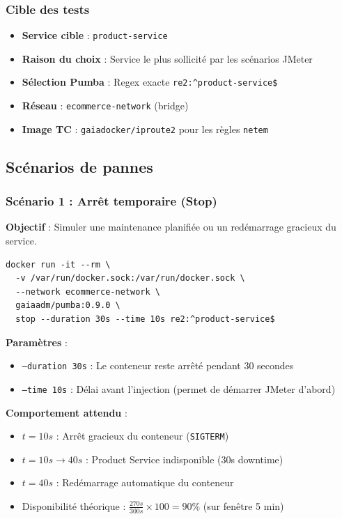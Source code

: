 \subsubsection{Cible des tests}

\begin{itemize}
    \item \textbf{Service cible} : \texttt{product-service}
    \item \textbf{Raison du choix} : Service le plus sollicité par les scénarios JMeter
    \item \textbf{Sélection Pumba} : Regex exacte \texttt{re2:\^{}product-service\$}
    \item \textbf{Réseau} : \texttt{ecommerce-network} (bridge)
    \item \textbf{Image TC} : \texttt{gaiadocker/iproute2} pour les règles \texttt{netem}
\end{itemize}

\subsection{Scénarios de pannes}

\subsubsection{Scénario 1 : Arrêt temporaire (Stop)}

\textbf{Objectif} : Simuler une maintenance planifiée ou un redémarrage gracieux du service.

\begin{lstlisting}[caption={Commande Pumba - Stop 30s}]
docker run -it --rm \
  -v /var/run/docker.sock:/var/run/docker.sock \
  --network ecommerce-network \
  gaiaadm/pumba:0.9.0 \
  stop --duration 30s --time 10s re2:^product-service$
\end{lstlisting}

\textbf{Paramètres} :
\begin{itemize}
    \item \texttt{--duration 30s} : Le conteneur reste arrêté pendant 30 secondes
    \item \texttt{--time 10s} : Délai avant l'injection (permet de démarrer JMeter d'abord)
\end{itemize}

\textbf{Comportement attendu} :
\begin{itemize}
    \item $t = 10s$ : Arrêt gracieux du conteneur (\texttt{SIGTERM})
    \item $t = 10s \rightarrow 40s$ : Product Service indisponible (30s downtime)
    \item $t = 40s$ : Redémarrage automatique du conteneur
    \item Disponibilité théorique : $\frac{270s}{300s} \times 100 = 90\%$ (sur fenêtre 5 min)
\end{itemize}

